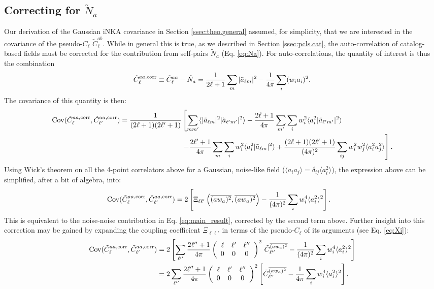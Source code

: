 \documentclass[aps,twocolumn, superscriptaddress, english, nofootinbib, 10pt]{revtex4-2}
\newcommand{\wtj}[6]{\left(\begin{array}{ccc} #1 & #2 & #3\\#4 & #5 & #6\end{array} \right)}
\begin{document}
  \subsection{Correcting for $\tilde{N}_a$}
    Our derivation of the Gaussian iNKA covariance in Section \ref{ssec:theo.general} assumed, for simplicity, that we are interested in the covariance of the pseudo-$C_\ell$ $\tilde{C}^{ab}_\ell$. While in general this is true, as we described in Section \ref{ssec:pcls.cat}, the auto-correlation of catalog-based fields must be corrected for the contribution from self-pairs $\tilde{N}_a$ (Eq. \ref{eq:Na}). For auto-correlations, the quantity of interest is thus the combination
    \begin{equation}
      \tilde{C}^{aa,{\rm corr}}_\ell\equiv \tilde{C}^{aa}_\ell-\tilde{N}_a=\frac{1}{2\ell+1}\sum_m|\tilde{a}_{\ell m}|^2-\frac{1}{4\pi}\sum_i(w_ia_i)^2.
    \end{equation}
    The covariance of this quantity is then:
    \begin{align}\nonumber
      {\rm Cov}(\tilde{C}^{aa,{\rm corr}}_\ell,\tilde{C}^{aa,{\rm corr}}_{\ell'})=\frac{1}{(2\ell+1)(2\ell'+1)}&\left[\sum_{mm'}\langle |\tilde{a}_{\ell m}|^2|\tilde{a}_{\ell' m'}|^2\rangle-\frac{2\ell+1}{4\pi}\sum_{m'}\sum_iw_i^2\langle a_i^2|\tilde{a}_{\ell' m'}|^2\rangle\right.\\\nonumber
      &\left.-\frac{2\ell'+1}{4\pi}\sum_m\sum_iw_i^2\langle a_i^2|\tilde{a}_{\ell m}|^2\rangle+\frac{(2\ell+1)(2\ell'+1)}{(4\pi)^2}\sum_{ij}w_i^2w_j^2\langle a_i^2a_j^2\rangle
      \right].
    \end{align}
    Using Wick's theorem on all the 4-point correlators above for a Gaussian, noise-like field ($\langle a_ia_j\rangle=\delta_{ij}\langle a_i^2\rangle$), the expression above can be simplified, after a bit of algebra, into:
    \begin{align}
      {\rm Cov}(\tilde{C}^{aa,{\rm corr}}_\ell,\tilde{C}^{aa,{\rm corr}}_{\ell'})
      &=2\left[\Xi_{\ell\ell'}\left(\overline{(aw_a)^2},\overline{(aw_a)^2}\right)-\frac{1}{(4\pi)^2}\sum_i w_i^4\langle a_i^2\rangle^2\right].
    \end{align}
    This is equivalent to the noise-noise contribution in Eq. \ref{eq:main_result}, corrected by the second term above. Further insight into this correction may be gained by expanding the coupling coefficient $\Xi_{\ell\ell'}$ in terms of the pseudo-$C_\ell$ of its arguments (see Eq. \ref{eq:Xi}):
    \begin{align}\nonumber
      {\rm Cov}(\tilde{C}^{aa,{\rm corr}}_\ell,\tilde{C}^{aa,{\rm corr}}_{\ell'})
      &=2\left[\sum_{\ell''}\frac{2\ell''+1}{4\pi}\wtj{\ell}{\ell'}{\ell''}{0}{0}{0}^2\,\tilde{C}^{\overline{(aw_a)^2}}_{\ell''}-\frac{1}{(4\pi)^2}\sum_i w_i^4\langle a_i^2\rangle^2\right]\\
      &=2\sum_{\ell''}\frac{2\ell''+1}{4\pi}\wtj{\ell}{\ell'}{\ell''}{0}{0}{0}^2\left[\tilde{C}^{\overline{(aw_a)^2}}_{\ell''}-\frac{1}{4\pi}\sum_i w_i^4\langle a_i^2\rangle^2\right],
    \end{align}
\end{document}
